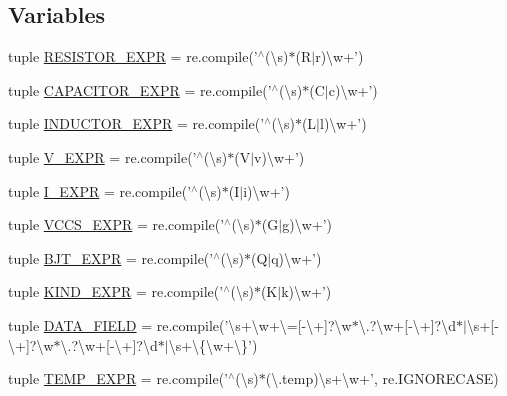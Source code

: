 \subsection*{Variables}
\begin{DoxyCompactItemize}
\item 
tuple \hyperlink{namespacesage__circuit__analysis_ad653e45f39302e51c2249c43c0a2d095}{R\-E\-S\-I\-S\-T\-O\-R\-\_\-\-E\-X\-P\-R} = re.\-compile('$^\wedge$(\textbackslash{}s)$\ast$(R$|$r)\textbackslash{}w+')
\item 
tuple \hyperlink{namespacesage__circuit__analysis_ac94c9a30cb3a3008b8cd76472bcac0b1}{C\-A\-P\-A\-C\-I\-T\-O\-R\-\_\-\-E\-X\-P\-R} = re.\-compile('$^\wedge$(\textbackslash{}s)$\ast$(C$|$c)\textbackslash{}w+')
\item 
tuple \hyperlink{namespacesage__circuit__analysis_a28ab0d30d46181ac6d7b033ef4cd7b2a}{I\-N\-D\-U\-C\-T\-O\-R\-\_\-\-E\-X\-P\-R} = re.\-compile('$^\wedge$(\textbackslash{}s)$\ast$(L$|$l)\textbackslash{}w+')
\item 
tuple \hyperlink{namespacesage__circuit__analysis_af319382f4c361c1e1d38e446e0466769}{V\-\_\-\-E\-X\-P\-R} = re.\-compile('$^\wedge$(\textbackslash{}s)$\ast$(V$|$v)\textbackslash{}w+')
\item 
tuple \hyperlink{namespacesage__circuit__analysis_aabc5e7c1a370cb2805023e6eef2ea933}{I\-\_\-\-E\-X\-P\-R} = re.\-compile('$^\wedge$(\textbackslash{}s)$\ast$(I$|$i)\textbackslash{}w+')
\item 
tuple \hyperlink{namespacesage__circuit__analysis_a22033439ae0926b745e78c7e9c4aeea7}{V\-C\-C\-S\-\_\-\-E\-X\-P\-R} = re.\-compile('$^\wedge$(\textbackslash{}s)$\ast$(G$|$g)\textbackslash{}w+')
\item 
tuple \hyperlink{namespacesage__circuit__analysis_ad9a63538d26a69e4e17043419e7e375d}{B\-J\-T\-\_\-\-E\-X\-P\-R} = re.\-compile('$^\wedge$(\textbackslash{}s)$\ast$(Q$|$q)\textbackslash{}w+')
\item 
tuple \hyperlink{namespacesage__circuit__analysis_a4d87352a85623b7cc6ab51c2f07165fb}{K\-I\-N\-D\-\_\-\-E\-X\-P\-R} = re.\-compile('$^\wedge$(\textbackslash{}s)$\ast$(K$|$k)\textbackslash{}w+')
\item 
tuple \hyperlink{namespacesage__circuit__analysis_a45b1d5b538d2ca4814b4c5be71ed415f}{D\-A\-T\-A\-\_\-\-F\-I\-E\-L\-D} = re.\-compile('\textbackslash{}s+\textbackslash{}w+\textbackslash{}=\mbox{[}-\/\textbackslash{}+\mbox{]}?\textbackslash{}w$\ast$\textbackslash{}.?\textbackslash{}w+\mbox{[}-\/\textbackslash{}+\mbox{]}?\textbackslash{}d$\ast$$|$\textbackslash{}s+\mbox{[}-\/\textbackslash{}+\mbox{]}?\textbackslash{}w$\ast$\textbackslash{}.?\textbackslash{}w+\mbox{[}-\/\textbackslash{}+\mbox{]}?\textbackslash{}d$\ast$$|$\textbackslash{}s+\textbackslash{}\{\textbackslash{}w+\textbackslash{}\}')
\item 
tuple \hyperlink{namespacesage__circuit__analysis_a4164fdd64fbbc924b260c7e813bf61ae}{T\-E\-M\-P\-\_\-\-E\-X\-P\-R} = re.\-compile('$^\wedge$(\textbackslash{}s)$\ast$(\textbackslash{}.temp)\textbackslash{}s+\textbackslash{}w+', re.\-I\-G\-N\-O\-R\-E\-C\-A\-S\-E)
\end{DoxyCompactItemize}


